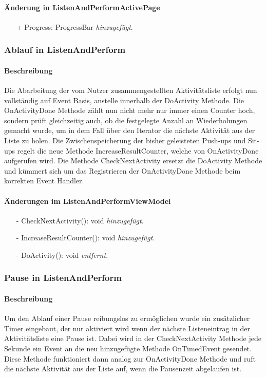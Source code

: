 \documentclass[a4paper,12pt]{article}
\begin{document}
\paragraph{Änderung in ListenAndPerformActivePage}
\begin{itemize}
	\item[+] Progress: ProgressBar \textit{hinzugefügt}.
\end{itemize}

\subsubsection{Ablauf in ListenAndPerform}
\paragraph{Beschreibung}
Die Abarbeitung der vom Nutzer zusammengestellten Aktivitätsliste erfolgt nun vollständig auf Event Basis, anstelle innerhalb der DoActivity Methode. Die OnActivityDone Methode zählt nun nicht mehr nur immer einen Counter hoch, sondern prüft gleichzeitig auch, ob die festgelegte Anzahl an Wiederholungen gemacht wurde, um in dem Fall über den Iterator die nächste Aktivität aus der Liste zu holen. Die Zwischenspeicherung der bisher geleisteten Push-ups und Sit-ups regelt die neue Methode IncreaseResultCounter, welche von OnActivityDone aufgerufen wird. Die Methode CheckNextActivity ersetzt die DoActivity Methode und kümmert sich um das Registrieren der OnActivityDone Methode beim korrekten Event Handler. 
\paragraph{Änderungen im ListenAndPerformViewModel}
\begin{itemize}
	\item[-] CheckNextActivity(): void \textit{hinzugefügt}.
	\item[-] IncreaseResultCounter(): void \textit{hinzugefügt}.
	\item[-] DoActivity(): void \textit{entfernt}.
\end{itemize}
	
\subsubsection{Pause in ListenAndPerform}
\paragraph{Beschreibung}
Um den Ablauf einer Pause reibungslos zu ermöglichen wurde ein zusätzlicher Timer eingebaut, der nur aktiviert wird wenn der nächste Listeneintrag in der Aktivitätsliste eine Pause ist. Dabei wird in der CheckNextActivity Methode jede Sekunde ein Event an die neu hinzugefügte Methode OnTimedEvent gesendet. Diese Methode funktioniert dann analog zur OnActivityDone Methode und ruft die nächste Aktivität aus der Liste auf, wenn die Pausenzeit abgelaufen ist.
\end{document}
